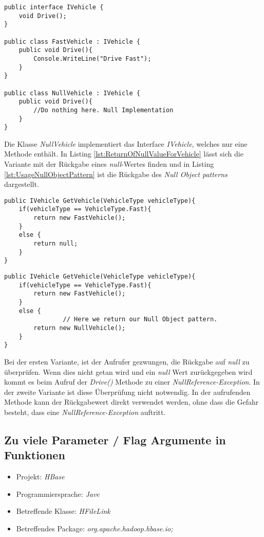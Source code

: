 \begin{lstlisting}[language={[Sharp]C}, caption=Null Object pattern, label=lst:NullObjectPattern]
public interface IVehicle {
    void Drive();
}

public class FastVehicle : IVehicle {
    public void Drive(){
        Console.WriteLine("Drive Fast");
    }
}

public class NullVehicle : IVehicle {
    public void Drive(){
        //Do nothing here. Null Implementation
    }
}
\end{lstlisting}

\SuperPar Die Klasse \textit{NullVehicle} implementiert das Interface \textit{IVehicle}, welches nur eine Methode enthält. In Listing \ref{lst:ReturnOfNullValueForVehicle} lässt sich die Variante mit der Rückgabe eines \textit{null}-Wertes finden und in Listing \ref{lst:UsageNullObjectPattern} ist die Rückgabe des \textit{Null Object patterns} dargestellt.

\begin{lstlisting}[language={[Sharp]C}, caption=Rückgabe eines null Wertes, label=lst:ReturnOfNullValueForVehicle]
public IVehicle GetVehicle(VehicleType vehicleType){
    if(vehicleType == VehicleType.Fast){
        return new FastVehicle();
    }
    else {
        return null; 
    }
}
\end{lstlisting}


\begin{lstlisting}[language={[Sharp]C}, caption=Rückgabe des Null Object patterns, label=lst:UsageNullObjectPattern]
public IVehicle GetVehicle(VehicleType vehicleType){
    if(vehicleType == VehicleType.Fast){
        return new FastVehicle();
    }
    else {
				// Here we return our Null Object pattern.
        return new NullVehicle();
    }
}
\end{lstlisting}

\SuperPar Bei der ersten Variante, ist der Aufrufer gezwungen, die Rückgabe auf \textit{null} zu überprüfen. Wenn dies nicht getan wird und ein \textit{null} Wert zurückgegeben wird kommt es beim Aufruf der \textit{Drive()} Methode zu einer \textit{NullReference-Exception}. In der zweite Variante ist diese Überprüfung nicht notwendig. In der aufrufenden Methode kann der Rückgabewert direkt verwendet werden, ohne dass die Gefahr besteht, dass eine \textit{NullReference-Exception} auftritt.

\subsection{Zu viele Parameter / Flag Argumente in Funktionen}
\begin{itemize}
	\item Projekt: \textit{HBase}
	\item Programmiersprache: \textit{Jave}
	\item Betreffende Klasse: \textit{HFileLink}
	\item Betreffendes Package: \textit{org.apache.hadoop.hbase.io;}
\end{itemize}

